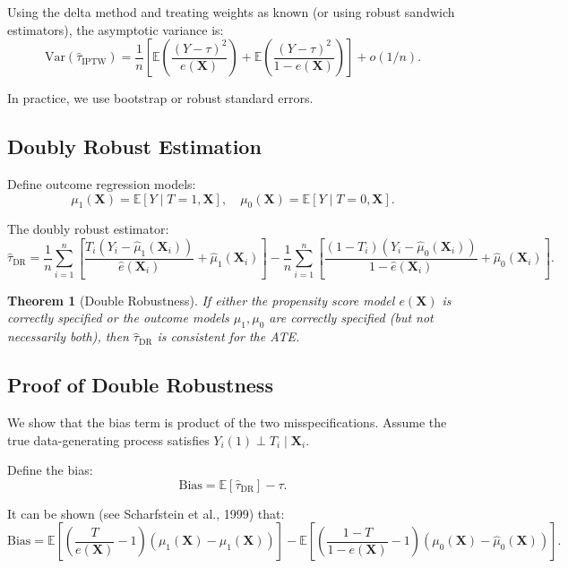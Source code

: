 \documentclass[12pt]{article}
\numberwithin{equation}{section}
\newtheorem{theorem}{Theorem}[section]
\begin{document}
	Using the delta method and treating weights as known (or using robust sandwich estimators), the asymptotic variance is:
	\[
	\text{Var}(\hat{\tau}_{\text{IPTW}}) = \frac{1}{n} \left[ \mathbb{E}\left(\frac{(Y - \tau)^2}{e(\mathbf{X})}\right) + \mathbb{E}\left(\frac{(Y - \tau)^2}{1-e(\mathbf{X})}\right) \right] + o(1/n).
	\]
	
	In practice, we use bootstrap or robust standard errors.
	
	\subsection{Doubly Robust Estimation}
	
	Define outcome regression models:
	\[
	\mu_1(\mathbf{X}) = \mathbb{E}[Y \mid T=1, \mathbf{X}], \quad \mu_0(\mathbf{X}) = \mathbb{E}[Y \mid T=0, \mathbf{X}].
	\]
	
	The doubly robust estimator:
	\[
	\hat{\tau}_{\text{DR}} = \frac{1}{n} \sum_{i=1}^n \left[ \frac{T_i(Y_i - \hat{\mu}_1(\mathbf{X}_i))}{\hat{e}(\mathbf{X}_i)} + \hat{\mu}_1(\mathbf{X}_i) \right] - \frac{1}{n} \sum_{i=1}^n \left[ \frac{(1-T_i)(Y_i - \hat{\mu}_0(\mathbf{X}_i))}{1-\hat{e}(\mathbf{X}_i)} + \hat{\mu}_0(\mathbf{X}_i) \right].
	\]
	
	\begin{theorem}[Double Robustness]
		If either the propensity score model $e(\mathbf{X})$ is correctly specified or the outcome models $\mu_1, \mu_0$ are correctly specified (but not necessarily both), then $\hat{\tau}_{\text{DR}}$ is consistent for the ATE.
	\end{theorem}
	
	\subsection{Proof of Double Robustness}
	
	We show that the bias term is product of the two misspecifications. Assume the true data-generating process satisfies $Y_i(1) \perp T_i \mid \mathbf{X}_i$.
	
	Define the bias:
	\[
	\text{Bias} = \mathbb{E}[\hat{\tau}_{\text{DR}}] - \tau.
	\]
	
	It can be shown (see Scharfstein et al., 1999) that:
	\[
	\text{Bias} = \mathbb{E}\left[ \left( \frac{T}{e(\mathbf{X})} - 1 \right) (\mu_1(\mathbf{X}) - \hat{\mu}_1(\mathbf{X})) \right] - \mathbb{E}\left[ \left( \frac{1-T}{1-e(\mathbf{X})} - 1 \right) (\mu_0(\mathbf{X}) - \hat{\mu}_0(\mathbf{X})) \right].
	\]
	
\end{document}
